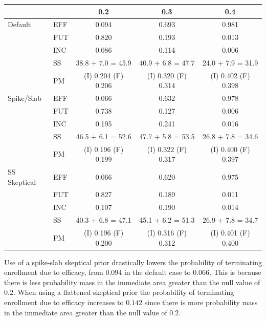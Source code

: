 \documentclass[12pt]{article}
\begin{document}
\begin{center}
\begin{tabular}{ll|ccc}
	&		&	0.2	&	0.3	&	0.4	\\
\hline
Default	&	EFF	&	0.094	&	0.693	&	0.981	\\
	&	FUT	&	0.820	&	0.193	&	0.013	\\
	&	INC	&	0.086	&	0.114	&	0.006	\\
	&	SS	&	38.8 + 7.0 = 45.9	&	40.9 + 6.8 = 47.7	&	24.0 + 7.9 = 31.9	\\
	&	PM	&	(I) 0.204 (F) 0.206	&	(I) 0.320 (F) 0.314	&	(I) 0.402 (F) 0.398	\\
\hline
Spike/Slab	&	EFF	&	0.066	&	0.632	&	0.978	\\
	&	FUT	&	0.738	&	0.127	&	0.006	\\
	&	INC	&	0.195	&	0.241	&	0.016	\\
	&	SS	&	46.5 + 6.1 = 52.6	&	47.7 + 5.8 = 53.5	&	26.8 + 7.8 = 34.6	\\
	&	PM	&	(I) 0.196 (F) 0.199	&	(I) 0.322 (F) 0.317	&	(I) 0.400 (F) 0.397	\\
\hline
SS Skeptical	&	EFF	&	0.066	&	0.620	&	0.975	\\
	&	FUT	&	0.827	&	0.189	&	0.011	\\
	&	INC	&	0.107	&	0.190	&	0.014	\\
	&	SS	&	40.3 + 6.8 = 47.1	&	45.1 + 6.2 = 51.3	&	26.9 + 7.8 = 34.7	\\
	&	PM	&	(I) 0.196 (F) 0.200	&	(I) 0.316 (F) 0.312	&	(I) 0.401 (F) 0.400	\\

\end{tabular}
\end{center}
Use of a spike-slab skeptical prior drastically lowers the probability of terminating enrollment due to efficacy, from $0.094$ in the default case to $0.066$. This is because there is less probability mass in the immediate area greater than the null value of $0.2$. When using a flattened skeptical prior the probability of terminating enrollment due to efficacy increases to $0.142$ since there is more probability mass in the immediate area greater than the null value of $0.2$.
\newpage
\end{document}
